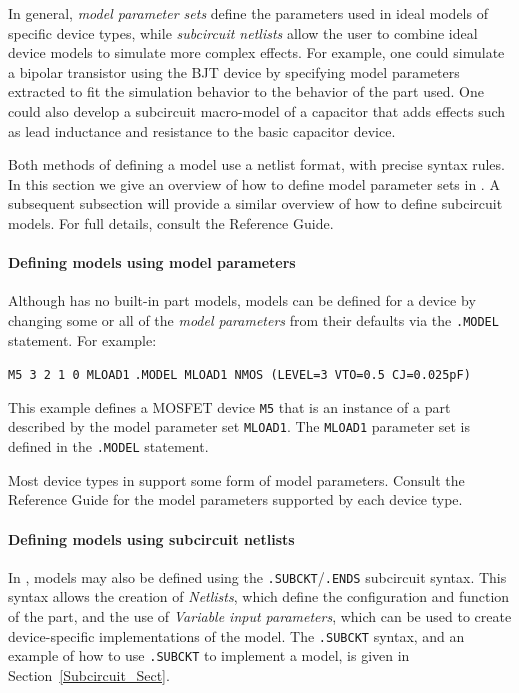In general, {\em model parameter sets} define the parameters used in ideal
models of specific device types, while {\em subcircuit netlists} allow the user
to combine ideal device models to simulate more complex effects.  For example,
one could simulate a bipolar transistor using the \Xyce{} BJT device by specifying
model parameters extracted to fit the simulation behavior to the behavior of
the part used. One could also develop a subcircuit macro-model of a capacitor
that adds effects such as lead inductance and resistance to the basic capacitor
device.

Both methods of defining a model use a netlist format, with precise
syntax rules.  In this section we give an overview of how to define
model parameter sets in \Xyce{}.  A subsequent subsection will provide a
similar overview of how to define subcircuit models.  For full
details, consult the \Xyce{} Reference Guide\ReferenceGuide.

\paragraph{Defining models using model parameters}

Although \Xyce{} has no built-in part models,  models can be defined for a
device by changing some or all of the {\em model parameters} from their
defaults via the \texttt{.MODEL} statement. For example:

\begin{vquote}
 \texttt{M5 3 2 1 0 MLOAD1}
 \texttt{.MODEL MLOAD1 NMOS (LEVEL=3 VTO=0.5 CJ=0.025pF)}
\end{vquote}

This example defines a MOSFET device \texttt{M5} that is an instance of a part
described by the model parameter set \texttt{MLOAD1}.  The \texttt{MLOAD1}
parameter set is defined in the \texttt{.MODEL} statement.

Most device types in \Xyce{} support some form of model parameters.  Consult
the \Xyce{} Reference Guide\ReferenceGuide{} for the model parameters supported
by each device type.

\paragraph{Defining models using subcircuit netlists}

In \Xyce{}, models may also be defined using the
\texttt{.SUBCKT}/\texttt{.ENDS} subcircuit syntax. This syntax allows the
creation of {\em Netlists}, which define the configuration and function of the
part, and the use of {\em Variable input parameters}, which can be used to
create device-specific implementations of the model.  The \texttt{.SUBCKT}
syntax, and an example of how to use \texttt{.SUBCKT} to implement a model, is
given in Section~\ref{Subcircuit_Sect}.

